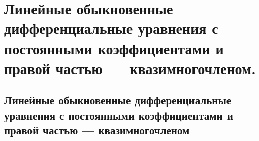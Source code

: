 \chapter{Линейные обыкновенные дифференциальные уравнения с постоянными коэффициентами и правой частью — квазимногочленом.}
\section{Линейные обыкновенные дифференциальные уравнения с постоянными коэффициентами и правой частью — квазимногочленом}
